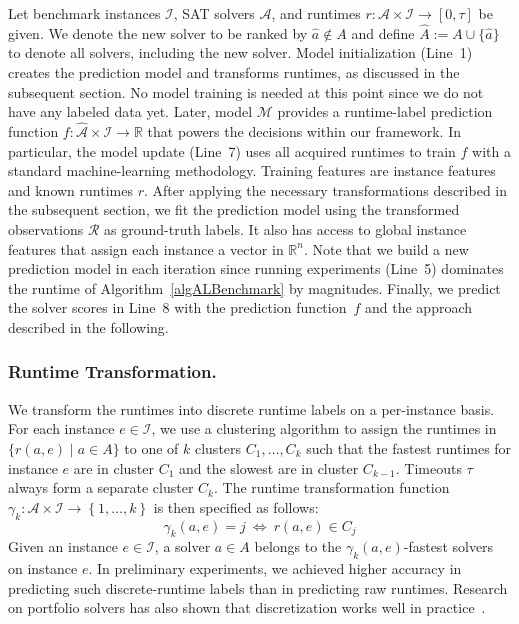 \documentclass[runningheads]{llncs}
\begin{document}
Let benchmark instances $\mathcal{I}$, SAT solvers $\mathcal{A}$, and runtimes $r : \mathcal{A} \times \mathcal{I} \rightarrow \left[0, \tau\right]$ be given.
We denote the new solver to be ranked by $\hat a \not\in A$ and define $\hat A := A \cup \lbrace \hat a \rbrace$ to denote all solvers, including the new solver. 
Model initialization (Line~1) creates the prediction model and transforms runtimes, as discussed in the subsequent section.
No model training is needed at this point since we do not have any labeled data yet.
Later, model $\mathcal{M}$ provides a runtime-label prediction function $f : \mathcal{\hat A} \times \mathcal{I} \rightarrow \mathbb{R}$ that powers the decisions within our framework.
In particular, the model update (Line~7) uses all acquired runtimes to train $f$ with a standard machine-learning methodology.
Training features are instance features and known runtimes $r$.
After applying the necessary transformations described in the subsequent section, we fit the prediction model using the transformed observations $\mathcal{R}$ as ground-truth labels.
It also has access to global instance features that assign each instance a vector in $\mathbb{R}^n$.
Note that we build a new prediction model in each iteration since running experiments (Line~5) dominates the runtime of Algorithm~\ref{algALBenchmark} by magnitudes.
Finally, we predict the solver scores in Line~8 with the prediction function~$f$ and the approach described in the following.

\subsubsection{Runtime Transformation.}

We transform the runtimes into discrete runtime labels on a per-instance basis.
For each instance $e \in \mathcal{I}$, we use a clustering algorithm to assign the runtimes in $\bigl\{ r(a, e) \mid a \in A \bigr\}$ to one of $k$ clusters $C_1, \dots, C_k$ such that the fastest runtimes for instance $e$ are in cluster $C_1$ and the slowest are in cluster $C_{k-1}$.
Timeouts $\tau$ always form a separate cluster $C_{k}$.
The runtime transformation function $\gamma_k : {\mathcal{A} \times \mathcal{I}} \rightarrow \left\lbrace 1, \dots, k \right\rbrace$ is then specified as follows:
%
$$\gamma_k(a, e) = j ~\Leftrightarrow~ r(a, e) \in C_j$$
%
Given an instance $e \in \mathcal{I}$, a solver $a \in A$ belongs to the $\gamma_k(a, e)$-fastest solvers on instance $e$. 
In preliminary experiments, we achieved higher accuracy in predicting such discrete-runtime labels than in predicting raw runtimes.
Research on portfolio solvers has also shown that discretization works well in practice~\cite{CollauttiMMO13,NgokoCT19}.
\end{document}
